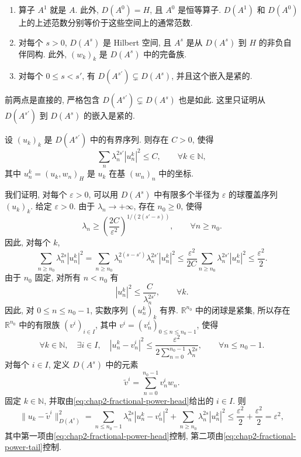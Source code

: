 \begin{Proposition}
\label{prop:chap2-fractional-power-properties}
\begin{enumerate}
 \item 算子 $A^1$ 就是 $A$. 此外, $D(A^0)=H$, 且 $A^0$ 是恒等算子. $D(A^1)$ 和 $D(A^0)$ 上的上述范数分别等价于这些空间上的通常范数.
 \item 对每个 $s>0$, $D(A^s)$ 是 Hilbert 空间, 且 $A^s$ 是从 $D(A^s)$ 到 $H$ 的非负自伴同构. 此外, $(w_k)_k$ 是 $D(A^s)$ 中的完备族.
 \item 对每个 $0\leq s<s'$, 有 $D(A^{s'})\subsetneq D(A^s)$, 并且这个嵌入是紧的.
\end{enumerate}
\end{Proposition}

\begin{Proof}
前两点是直接的, 严格包含 $D(A^{s'})\subsetneq D(A^s)$ 也是如此. 这里只证明从 $D(A^{s'})$ 到 $D(A^s)$ 的嵌入是紧的.

设 $(u_k)_k$ 是 $D(A^{s'})$ 中的有界序列. 则存在 $C>0$, 使得
\[
 \sum_n\lambda_n^{2s'}|u_n^k|^2\leq C,
 \qquad\forall k\in\mathbb N,
\]
其中 $u_n^k=(u_k,w_n)_H$ 是 $u_k$ 在基 $(w_n)_n$ 中的坐标.

我们证明, 对每个 $\varepsilon>0$, 可以用 $D(A^s)$ 中有限多个半径为 $\varepsilon$ 的球覆盖序列 $(u_k)_k$. 给定 $\varepsilon>0$. 由于 $\lambda_n\to+\infty$, 存在 $n_0\geq0$, 使得
\[
 \lambda_n\geq\left(\frac{2C}{\varepsilon^2}\right)^{1/(2(s'-s))},
 \qquad\forall n\geq n_0.
\]
因此, 对每个 $k$,
\begin{equation}
 \sum_{n\geq n_0}\lambda_n^{2s}|u_n^k|^2
 =\sum_{n\geq n_0}\lambda_n^{2(s-s')}\lambda_n^{2s'}|u_n^k|^2
 \leq\frac{\varepsilon^2}{2C}\sum_{n\geq n_0}\lambda_n^{2s'}|u_n^k|^2
 \leq\frac{\varepsilon^2}{2}.
 \label{eq:chap2-fractional-power-tail}
\end{equation}
由于 $n_0$ 固定, 对所有 $n<n_0$ 有
\[
 |u_n^k|^2\leq\frac{C}{\lambda_n^{2s'}},
 \qquad\forall k.
\]
因此, 对 $0\leq n\leq n_0-1$, 实数序列 $(u_n^k)_k$ 有界. $\mathbb R^{n_0}$ 中的闭球是紧集, 所以存在 $\mathbb R^{n_0}$ 中的有限族 $(v^i)_{i\in I}$, 其中 $v^i=(v_n^i)_{0\leq n\leq n_0-1}$, 使得
\begin{equation}
 \forall k\in\mathbb N,\quad\exists i\in I,\quad
 |u_n^k-v_n^i|^2\leq
 \frac{\varepsilon^2}{2\sum_{n=0}^{n_0-1}\lambda_n^{2s}},
 \qquad\forall n\leq n_0-1.
 \label{eq:chap2-fractional-power-head}
\end{equation}
对每个 $i\in I$, 定义 $D(A^s)$ 中的元素
\[
 \widetilde v^i=\sum_{n=0}^{n_0-1}v_n^iw_n.
\]
固定 $k\in\mathbb N$, 并取由\eqref{eq:chap2-fractional-power-head}给出的 $i\in I$. 则
\[
 \|u_k-\widetilde v^i\|_{D(A^s)}^2
 =\sum_{n\leq n_0-1}\lambda_n^{2s}|u_n^k-v_n^i|^2
 +\sum_{n\geq n_0}\lambda_n^{2s}|u_n^k|^2
 \leq\frac{\varepsilon^2}{2}+\frac{\varepsilon^2}{2}=\varepsilon^2,
\]
其中第一项由\eqref{eq:chap2-fractional-power-head}控制, 第二项由\eqref{eq:chap2-fractional-power-tail}控制.
\end{Proof}

